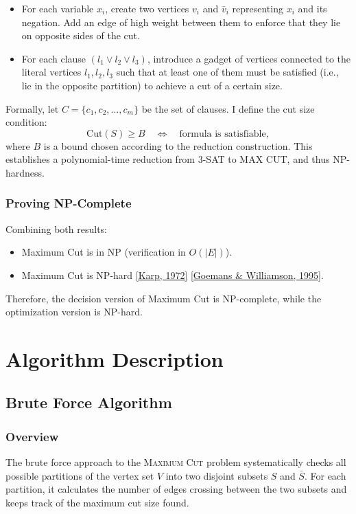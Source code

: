 \documentclass[12pt]{article}
\begin{document}
\begin{itemize}
    \item For each variable $x_i$, create two vertices $v_i$ and $\bar{v}_i$ representing $x_i$ and its negation. 
    Add an edge of high weight between them to enforce that they lie on opposite sides of the cut.
    \item For each clause $(l_1 \vee l_2 \vee l_3)$, introduce a gadget of vertices connected 
    to the literal vertices $l_1, l_2, l_3$ such that at least one of them must be satisfied 
    (i.e., lie in the opposite partition) to achieve a cut of a certain size.
\end{itemize}

Formally, let $C = \{c_1, c_2, \dots, c_m\}$ be the set of clauses. 
I define the cut size condition:
\[
\text{Cut}(S) \geq B \quad \iff \quad \text{formula is satisfiable},
\]
where $B$ is a bound chosen according to the reduction construction.
This establishes a polynomial-time reduction from 3-SAT to MAX CUT, and thus NP-hardness.

\subsubsection{Proving NP-Complete}
Combining both results:
\begin{itemize}
    \item Maximum Cut is in NP (verification in $O(|E|)$).
    \item Maximum Cut is NP-hard \href{https://www.cs.cornell.edu/courses/cs722/2000sp/karp.pdf}{[Karp, 1972]} \href{https://math.mit.edu/~goemans/PAPERS/maxcut-jacm.pdf}{[Goemans \& Williamson, 1995]}.
\end{itemize}
Therefore, the decision version of Maximum Cut is NP-complete, while 
the optimization version is NP-hard.

\section{Algorithm Description}

\subsection{Brute Force Algorithm}

\subsubsection{Overview}
The brute force approach to the \textsc{Maximum Cut} problem systematically 
checks all possible partitions of the vertex set $V$ into two disjoint subsets 
$S$ and $\bar{S}$. For each partition, it calculates the number of edges 
crossing between the two subsets and keeps track of the maximum cut size found. 
\end{document}
